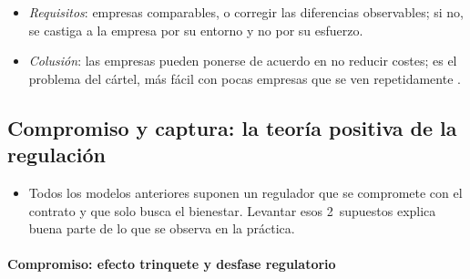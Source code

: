 \documentclass[11pt]{article}
\begin{document}
\begin{itemize}
\item \emph{Requisitos}: empresas comparables, o corregir las diferencias observables; si no, se castiga a la empresa por su entorno y no por su esfuerzo.
\item \emph{Colusión}: las empresas pueden ponerse de acuerdo en no reducir costes\nocite{BaldwinCaveLodge2012Understanding}; es el problema del cártel, más fácil con pocas empresas que se ven repetidamente .
\end{itemize}

\subsection{Compromiso y captura: la teoría positiva de la regulación}\label{sec:compromiso-captura}

\begin{itemize}
\item Todos los modelos anteriores suponen un regulador que se compromete con el contrato y que solo busca el bienestar. Levantar esos 2~supuestos explica buena parte de lo que se observa en la práctica.
\end{itemize}

\paragraph{Compromiso: efecto trinquete y desfase regulatorio}
\end{document}

